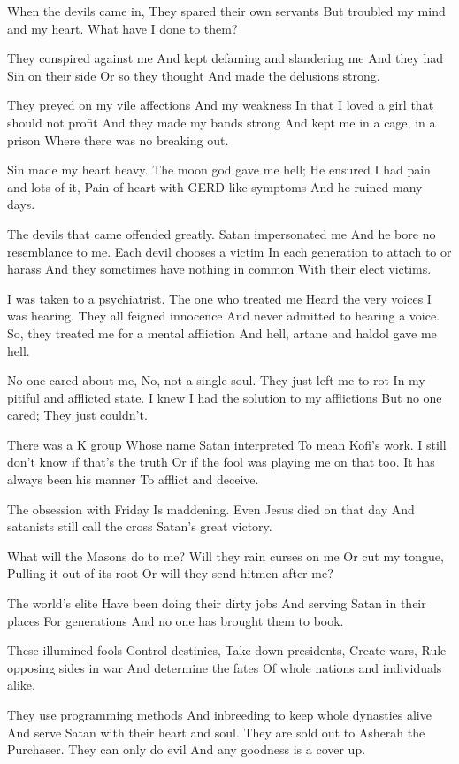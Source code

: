 \documentclass[
]{book}
\begin{document}
When the devils came in,
They spared their own servants
But troubled my mind and my heart.
What have I done to them?

They conspired against me
And kept defaming and slandering me
And they had Sin on their side
Or so they thought
And made the delusions strong.

They preyed on my vile affections
And my weakness
In that I loved a girl that should not profit
And they made my bands strong
And kept me in a cage, in a prison
Where there was no breaking out.

Sin made my heart heavy.
The moon god gave me hell;
He ensured I had pain and lots of it,
Pain of heart with GERD-like symptoms
And he ruined many days.

The devils that came offended greatly.
Satan impersonated me
And he bore no resemblance to me.
Each devil chooses a victim
In each generation to attach to or harass
And they sometimes have nothing in common
With their elect victims.

I was taken to a psychiatrist.
The one who treated me
Heard the very voices I was hearing.
They all feigned innocence
And never admitted to hearing a voice.
So, they treated me for a mental affliction
And hell, artane and haldol gave me hell.

No one cared about me,
No, not a single soul.
They just left me to rot
In my pitiful and afflicted state.
I knew I had the solution to my afflictions
But no one cared;
They just couldn't.

There was a K group
Whose name Satan interpreted
To mean Kofi's work.
I still don't know if that's the truth
Or if the fool was playing me on that too.
It has always been his manner
To afflict and deceive.

The obsession with Friday
Is maddening.
Even Jesus died on that day
And satanists still call the cross
Satan's great victory.

What will the Masons do to me?
Will they rain curses on me
Or cut my tongue,
Pulling it out of its root
Or will they send hitmen after me?

The world's elite
Have been doing their dirty jobs
And serving Satan in their places
For generations
And no one has brought them to book.

These illumined fools
Control destinies,
Take down presidents,
Create wars,
Rule opposing sides in war
And determine the fates
Of whole nations and individuals alike.

They use programming methods
And inbreeding to keep whole dynasties alive
And serve Satan with their heart and soul.
They are sold out to Asherah the Purchaser.
They can only do evil
And any goodness is a cover up.
\end{document}
